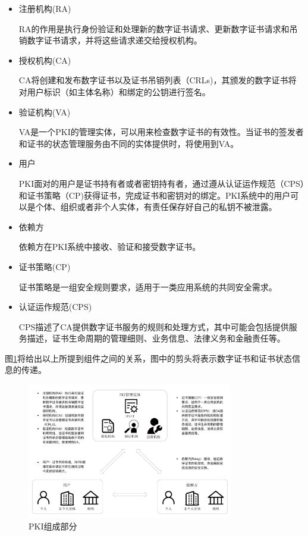 \begin{itemize}
	\item 

	注册机构(RA)

	RA的作用是执行身份验证和处理新的数字证书请求、更新数字证书请求和吊销数字证书请求，并将这些请求递交给授权机构。

	\item

	授权机构(CA)

	CA将创建和发布数字证书以及证书吊销列表（CRLs)，其颁发的数字证书将对用户标识（如主体名称）和绑定的公钥进行签名。

	\item

	验证机构(VA)

	VA是一个PKI的管理实体，可以用来检查数字证书的有效性。当证书的签发者和证书的状态管理服务由不同的实体提供时，将使用到VA。

	\item

	用户

	PKI面对的用户是证书持有者或者密钥持有者，通过遵从认证运作规范（CPS）和证书策略（CP)获得证书，完成证书和密钥对的绑定。PKI系统中的用户可以是个体、组织或者非个人实体，有责任保存好自己的私钥不被泄露。

	\item

	依赖方

	依赖方在PKI系统中接收、验证和接受数字证书。

	\item

	证书策略(CP)

	证书策略是一组安全规则要求，适用于一类应用系统的共同安全需求。

	\item

	认证运作规范(CPS)

	CPS描述了CA提供数字证书服务的规则和处理方式，其中可能会包括提供服务描述，证书生命周期的管理细则、业务信息、法律义务和金融责任等。
\end{itemize}

图\ref{fig:pki}将给出以上所提到组件之间的关系，图中的剪头将表示数字证书和证书状态信息的传递。

\begin{figure}[htbp]
 	\centering
 	\includegraphics[width = 0.8\textwidth]{img/pki}
 	\caption{PKI组成部分}\label{fig:pki}
\end{figure}

